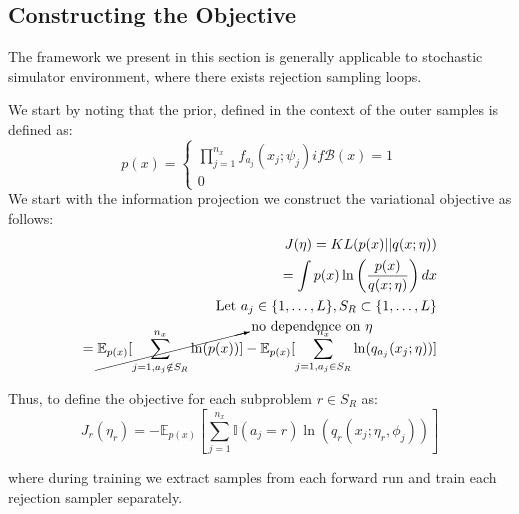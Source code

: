 \documentclass{article}
\begin{document}
\subsection{Constructing the Objective}

The framework we present in this section is generally applicable to stochastic simulator 
environment, where there exists rejection sampling loops. 

We start by noting that the prior, defined in the context of the outer samples is 
defined as: 
\begin{equation}
  p(x) = 
  \begin{cases}
    \prod^{n_{x}}_{j=1} f_{a_j}(x_j ; \psi_j) if \mathcal{B}(x) = 1 \\
    0
  \end{cases}
\end{equation}
We start with the information projection we construct the variational objective as follows:
\begin{align*}
  J(\eta) = KL(p(x) || q(x; \eta)) \\
   = \int p(x)\ln\left(\frac{p(x)}{q(x;\eta)}\right) dx \\
   \text{Let } a_{j} \in \{1, \ldots, L\} , S_{R} \subset \{1, \ldots, L\} \\
   = \cancelto{\text{no dependence on } \eta}{\mathbb{E}_{p(x)}[\sum^{n_x}_{j=1,a_j \notin S_{R}}\ln(p(x))]}-\mathbb{E}_{p(x)}[\sum^{n_x}_{j=1,a_j \in S_{R}}\ln(q_{a_j}(x_j;\eta))]\\
\end{align*}

Thus, to define the objective for each subproblem $r  \in S_{R}$ as:
\begin{equation}
  \label{eq:objective}
  J_{r}(\eta_r) = -\mathbb{E}_{p(x)}[\sum^{n_x}_{j=1}\mathbb{I}(a_j = r)\ln(q_r(x_j;\eta_r, \phi_j))]
\end{equation}

where during training we extract samples from each forward run and train each rejection sampler
separately. 
\end{document}
